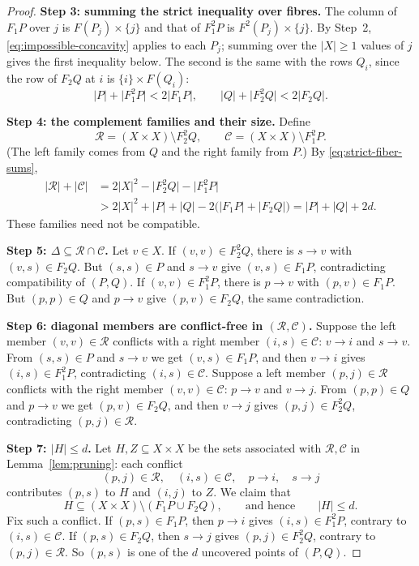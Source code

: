 \documentclass[11pt]{article}
\theoremstyle{remark}
\newcommand{\abs}[1]{\lvert #1\rvert}
\newcommand{\Step}[1]{\par\medskip\noindent\textbf{#1}\enspace}
\newcommand{\cR}{\mathcal R}
\newcommand{\cC}{\mathcal C}
\begin{document}
\begin{proof}
\Step{Step 3: summing the strict inequality over fibres.}
The column of $F_1P$ over $j$ is $F(P_j)\times\{j\}$ and that of $F_1^2P$
is $F^2(P_j)\times\{j\}$. By Step~2, \eqref{eq:impossible-concavity} applies
to each $P_j$; summing over the $\abs X\ge1$ values of $j$ gives the first
inequality below. The second is the same with the rows $Q_i$, since the row
of $F_2Q$ at $i$ is $\{i\}\times F(Q_i)$:
\begin{equation}\label{eq:strict-fiber-sums}
 \abs{P}+\abs{F_1^2P}<2\abs{F_1P},\qquad
 \abs{Q}+\abs{F_2^2Q}<2\abs{F_2Q}.
\end{equation}

\Step{Step 4: the complement families and their size.}
Define
\[
 \mathcal R=(X\times X)\setminus F_2^2Q,
 \qquad
 \mathcal C=(X\times X)\setminus F_1^2P .
\]
(The left family comes from $Q$ and the right family from $P$.)
By \eqref{eq:strict-fiber-sums},
\begin{equation}\label{eq:complement-gain}
 \begin{aligned}
 \abs{\mathcal R}+\abs{\mathcal C}
 &=2\abs{X}^2-\abs{F_2^2Q}-\abs{F_1^2P}\\
 &>2\abs{X}^2+\abs P+\abs Q-2\bigl(\abs{F_1P}+\abs{F_2Q}\bigr)
 =\abs P+\abs Q+2d.
 \end{aligned}
\end{equation}
These families need not be compatible.

\Step{Step 5: $\Delta\subseteq\cR\cap\cC$.}
Let $v\in X$. If $(v,v)\in F_2^2Q$, there is $s\to v$ with
$(v,s)\in F_2Q$. But $(s,s)\in P$ and $s\to v$ give $(v,s)\in F_1P$,
contradicting compatibility of $(P,Q)$. If $(v,v)\in F_1^2P$, there is
$p\to v$ with $(p,v)\in F_1P$. But $(p,p)\in Q$ and $p\to v$ give
$(p,v)\in F_2Q$, the same contradiction.

\Step{Step 6: diagonal members are conflict-free in $(\cR,\cC)$.}
Suppose the left member $(v,v)\in\cR$ conflicts with a right member
$(i,s)\in\cC$: $v\to i$ and $s\to v$. From $(s,s)\in P$ and $s\to v$ we
get $(v,s)\in F_1P$, and then $v\to i$ gives $(i,s)\in F_1^2P$,
contradicting $(i,s)\in\cC$. Suppose a left member $(p,j)\in\cR$ conflicts
with the right member $(v,v)\in\cC$: $p\to v$ and $v\to j$. From
$(p,p)\in Q$ and $p\to v$ we get $(p,v)\in F_2Q$, and then $v\to j$ gives
$(p,j)\in F_2^2Q$, contradicting $(p,j)\in\cR$.

\Step{Step 7: $\abs H\le d$.}
Let $H,Z\subseteq X\times X$ be the sets associated with
$\mathcal R,\mathcal C$ in Lemma~\ref{lem:pruning}: each conflict
\[
 (p,j)\in\mathcal R,\quad (i,s)\in\mathcal C,\quad
 p\to i,\quad s\to j
\]
contributes $(p,s)$ to $H$ and $(i,j)$ to $Z$.
We claim that
\begin{equation}\label{eq:old-uncovered-bound}
 H\subseteq (X\times X)\setminus(F_1P\cup F_2Q),
 \qquad\text{and hence}\qquad \abs{H}\le d.
\end{equation}
Fix such a conflict. If $(p,s)\in F_1P$, then $p\to i$ gives
$(i,s)\in F_1^2P$, contrary to $(i,s)\in\mathcal C$.
If $(p,s)\in F_2Q$, then $s\to j$ gives $(p,j)\in F_2^2Q$, contrary to
$(p,j)\in\mathcal R$. So $(p,s)$ is one of the $d$ uncovered points of
$(P,Q)$.


\end{proof}
\end{document}
